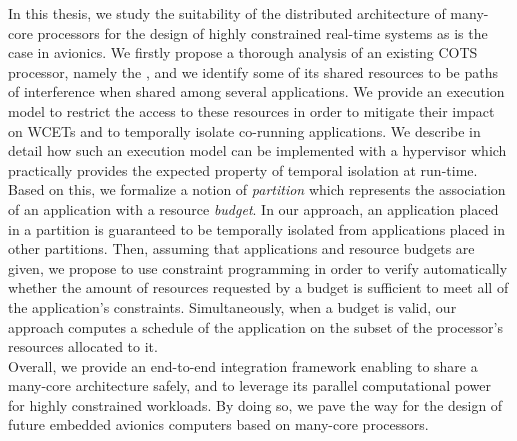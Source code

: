 \documentclass[main.tex]{subfiles}
\begin{document}
In this thesis, we study the suitability of the distributed architecture of many-core processors for the design of highly constrained real-time systems as is the case in avionics. We firstly propose a thorough analysis of an existing COTS processor, namely the \mppalong, and we identify some of its shared resources to be paths of interference when shared among several applications. We provide an execution model to restrict the access to these resources in order to mitigate their impact on WCETs and to temporally isolate co-running applications. We describe in detail how such an execution model can be implemented with a hypervisor which practically provides the expected property of temporal isolation at run-time. Based on this, we formalize a notion of \emph{partition} which represents the association of an application with a resource \emph{budget}. In our approach, an application placed in a partition is guaranteed to be temporally isolated from applications placed in other partitions. Then, assuming that applications and resource budgets are given, we propose to use constraint programming in order to verify automatically whether the amount of resources requested by a budget is sufficient to meet all of the application's constraints. Simultaneously, when a budget is valid, our approach computes a schedule of the application on the subset of the processor's resources allocated to it.  \\

Overall, we provide an end-to-end integration framework enabling to share a many-core architecture safely, and to leverage its parallel computational power for highly constrained workloads. By doing so, we pave the way for the design of future embedded avionics computers based on many-core processors.

\cleardoublepage
\end{document}
